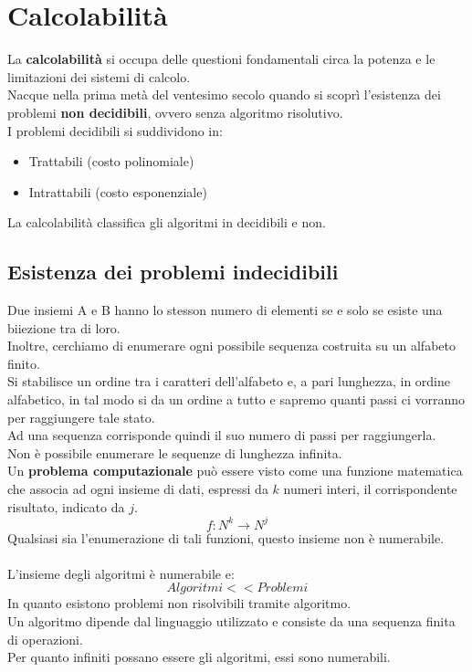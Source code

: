 \documentclass[a4paper,12pt]{article}
\let\oldsection\section
\renewcommand{\section}{\clearpage\oldsection}
\begin{document}
\section{Calcolabilità}
La \textbf{calcolabilità} si occupa delle questioni fondamentali circa la potenza e le limitazioni dei sistemi di calcolo.\\
Nacque nella prima metà del ventesimo secolo quando si scoprì l'esistenza dei problemi \textbf{non decidibili}, ovvero senza algoritmo risolutivo.\\
I problemi decidibili si suddividono in:
\begin{itemize}
    \item Trattabili (costo polinomiale)
    \item Intrattabili (costo esponenziale)
\end{itemize}
La calcolabilità classifica gli algoritmi in decidibili e non.\\
\subsection{Esistenza dei problemi indecidibili}
Due insiemi A e B hanno lo stesson numero di elementi se e solo se esiste una biiezione tra di loro.\\
Inoltre, cerchiamo di enumerare ogni possibile sequenza costruita su un alfabeto finito.\\
Si stabilisce un ordine tra i caratteri dell'alfabeto e, a pari lunghezza, in ordine alfabetico, in tal modo si da un ordine a tutto e sapremo quanti passi ci vorranno per raggiungere tale stato.\\
Ad una sequenza corrisponde quindi il suo numero di passi per raggiungerla.\\
Non è possibile enumerare le sequenze di lunghezza infinita.\\
Un \textbf{problema computazionale} può essere visto come una funzione matematica che associa ad ogni insieme di dati, espressi da $k$ numeri interi, il corrispondente risultato, indicato da $j$.\\
\[
f: N^k \to N^j
\]
Qualsiasi sia l'enumerazione di tali funzioni, questo insieme non è numerabile.\\\\
L'insieme degli algoritmi è numerabile e:
\[
Algoritmi << Problemi
\]
In quanto esistono problemi non risolvibili tramite algoritmo.\\
Un algoritmo dipende dal linguaggio utilizzato e consiste da una sequenza finita di operazioni.\\
Per quanto infiniti possano essere gli algoritmi, essi sono numerabili.\\
\end{document}
